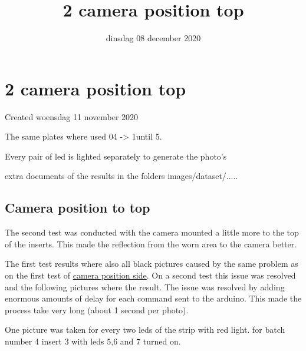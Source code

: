 \documentclass{scrartcl}
\title{2 camera position top}
\date{dinsdag 08 december 2020}
\author{}
\begin{document}
\maketitle

		\section{2 camera position top}

Created woensdag 11 november 2020



The same plates where used 04 -\textgreater{} 1until 5. 

Every pair of led is lighted separately to generate the photo's 



extra documents of the results in the folders images/dataset/.....



\subsection{Camera position to top}

The second test was conducted with the camera mounted a little more to the top of the inserts. This made the reflection from the worn area to the camera better. 

The first test results where also all black pictures caused by the same problem as on the first test of \href{./1_camera_position_side.tex}{camera position side}. On a second test this issue was resolved and the following pictures where the result. The issue was resolved by adding enormous amounts of delay for each command sent to the arduino. This made the process take very long (about 1 second per photo).



One picture was taken for every two leds of the strip with red light. for batch number 4 insert 3 with leds 5,6 and 7 turned on.
\end{document}
